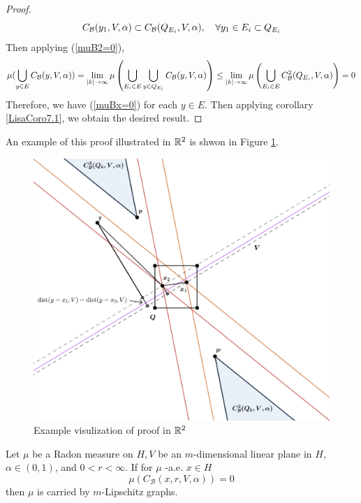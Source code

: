 \begin{proof}
\begin{equation}\label{eq:CysubsetCQ}
    C_{\mathcal B}(y_1, V, \alpha)\subset C_\mathcal B(Q_{E_i}, V, \alpha),\quad \forall y_1\in E_i \subset Q_{E_i}
\end{equation}
Then applying (\ref{muB2=0}), 
\begin{equation*}
    \begin{split}
        \mu(\bigcup_{y\in E}C_\mathcal B(y, V, \alpha))
        = \lim_{|k|\rightarrow \infty}\mu\left( \bigcup_{E_i\in E}\bigcup_{y\in Q_{E_i}} C_\mathcal B(y, V, \alpha) \right)  
        \leq \lim_{|k|\rightarrow\infty}\mu\left( \bigcup_{E_i\in E} C_\mathcal B^2(Q_{E_i}, V, \alpha) \right)
        = 0
    \end{split}
\end{equation*}
Therefore, we have (\ref{muBx=0}) for each $y\in E$. Then applying corollary \ref{LisaCoro7.1}, we obtain the desired result. 
\end{proof}



An example of this proof illustrated in $\mathbb{R}^2$ is shwon in Figure \ref{fig:CB1=CB2}.

\begin{figure}[H]
    \centering
    \includegraphics[width=.6\textwidth]{images/CB1=CB2.png}
    \caption{Example visulization of proof in $\mathbb{R}^2$}
    \label{fig:CB1=CB2}
\end{figure}


\begin{corollary}
    Let $\mu$ be a Radon measure on $H, V$ be an $m$-dimensional linear plane in $H$, $\alpha \in(0,1)$, and $0<r<\infty$. If for $\mu$ -a.e. $x \in H$
   $$
   \mu\left(C_{\mathcal{B}}(x, r, V, \alpha)\right)=0
   $$
   then $\mu$ is carried by $m$-Lipschitz graphs.
\end{corollary}




